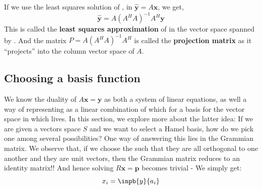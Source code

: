  If we use the least squares solution of , in \( \hat{\mathbf{y}} = A\mathbf{x} \), we get,
 	\[ \hat{\mathbf{y}} = A(A^H A)^{-1} A^H \mathbf{y} \]
This is called the \textbf{least squares approximation} of  in the vector space spanned by . And the matrix \( P = A(A^H A)^{-1} A^H \) is called the \textbf{projection matrix} as it ``projects''  into the column vector space of \(A\). 

\subsection{Choosing a basis function}
We know the duality of \(A\mathbf{x} = \mathbf{y}\) as both a system of linear equations, as well a way of representing  as a linear combination of  which for a basis for the vector space in which  lives. In this section, we explore more about the latter idea: If we are given a vectors space \(S\) and we want to select a Hamel basis, how do we pick one among several possibilities? One way of answering this lies in the Grammian matrix. We observe that, if we choose the  such that they are all orthogonal to one another and they are unit vectors, then the Grammian matrix reduces to an identity matrix!! And hence solving \(R\mathbf{x} = \mathbf{p}\) becomes trivial - We simply get:
	\[ x_i = \inpb{y}{a_i} \]







